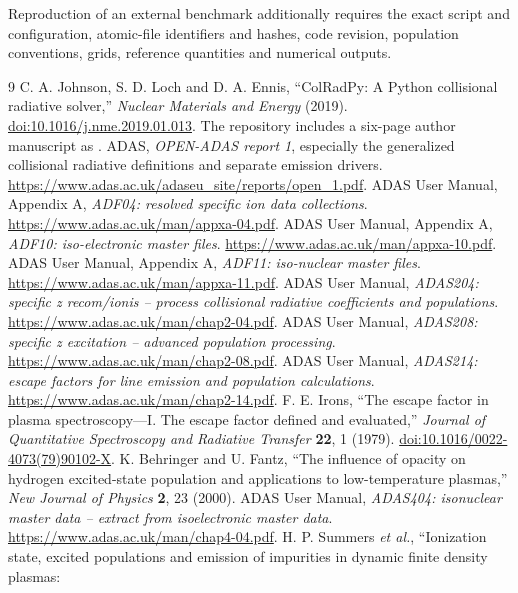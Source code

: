 \documentclass[11pt,a4paper]{article}
\newcommand{\code}[1]{\texttt{\detokenize{#1}}}
\numberwithin{equation}{section}
\begin{document}
Reproduction of an external benchmark additionally requires the
exact script and configuration, atomic-file identifiers and hashes,
code revision, population conventions, grids, reference quantities
and numerical outputs.

\clearpage
\begin{thebibliography}{9}
 C. A. Johnson, S. D. Loch and D. A. Ennis,
``ColRadPy: A Python collisional radiative solver,''
\emph{Nuclear Materials and Energy} (2019).
\href{https://doi.org/10.1016/j.nme.2019.01.013}{doi:10.1016/j.nme.2019.01.013}.
The repository includes a six-page author manuscript as
\code{docs/source/files/colradpy_paper.pdf}.
 ADAS, \emph{OPEN-ADAS report 1}, especially the
generalized collisional radiative definitions and separate emission drivers.
\url{https://www.adas.ac.uk/adaseu_site/reports/open_1.pdf}.
 ADAS User Manual, Appendix A, \emph{ADF04: resolved specific
ion data collections}.
\url{https://www.adas.ac.uk/man/appxa-04.pdf}.
 ADAS User Manual, Appendix A, \emph{ADF10: iso-electronic
master files}.
\url{https://www.adas.ac.uk/man/appxa-10.pdf}.
 ADAS User Manual, Appendix A, \emph{ADF11: iso-nuclear master
files}.
\url{https://www.adas.ac.uk/man/appxa-11.pdf}.
 ADAS User Manual, \emph{ADAS204: specific z recom/ionis --
process collisional radiative coefficients and populations}.
\url{https://www.adas.ac.uk/man/chap2-04.pdf}.
 ADAS User Manual, \emph{ADAS208: specific z excitation --
advanced population processing}.
\url{https://www.adas.ac.uk/man/chap2-08.pdf}.
 ADAS User Manual, \emph{ADAS214: escape factors for line
emission and population calculations}.
\url{https://www.adas.ac.uk/man/chap2-14.pdf}.
 F. E. Irons, ``The escape factor in plasma spectroscopy---I.
The escape factor defined and evaluated,'' \emph{Journal of Quantitative
Spectroscopy and Radiative Transfer} \textbf{22}, 1 (1979).
\href{https://doi.org/10.1016/0022-4073(79)90102-X}{doi:10.1016/0022-4073(79)90102-X}.
 K. Behringer and U. Fantz, ``The influence of opacity on
hydrogen excited-state population and applications to low-temperature
plasmas,'' \emph{New Journal of Physics} \textbf{2}, 23 (2000).
 ADAS User Manual, \emph{ADAS404: isonuclear master data --
extract from isoelectronic master data}.
\url{https://www.adas.ac.uk/man/chap4-04.pdf}.
 H. P. Summers \emph{et al.}, ``Ionization state, excited
populations and emission of impurities in dynamic finite density plasmas:

\end{thebibliography}
\end{document}
